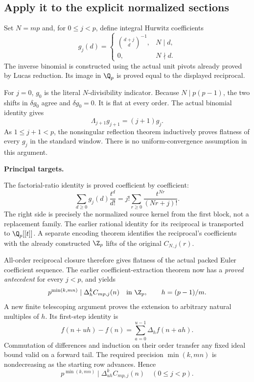 \subsection*{Apply it to the explicit normalized sections}
Set $N=mp$ and, for $0\le j<p$, define integral Hurwitz coefficients
\[
 g_j(d)=
 \begin{cases}
 \displaystyle\binom{d+j}{d}^{-1},&N\mid d,\\[1mm]
 0,&N\nmid d.
 \end{cases}
\]
The inverse binomial is constructed using the actual unit pivots already proved by Lucas reduction. Its image in $\Q_p$ is proved equal to the displayed reciprocal.

For $j=0$, $g_0$ is the literal $N$-divisibility indicator. Because $N\mid p(p-1)$, the two shifts in $\delta g_0$ agree and $\delta g_0=0$. It is flat at every order. The actual binomial identity gives
\[
 \Lambda_{j+1}g_{j+1}=(j+1)g_j.
\]
As $1\le j+1<p$, the nonsingular reflection theorem inductively proves flatness of every $g_j$ in the standard window. There is no uniform-convergence assumption in this argument.

\textbf{Principal targets.}\par
{}\par
{}\par
{}

\par\medskip
{}
The factorial-ratio identity is proved coefficient by coefficient:
\[
 \sum_{d\ge0}g_j(d)\frac{t^d}{d!}
 =j!\sum_{r\ge0}\frac{t^{Nr}}{(Nr+j)!}.
\]
The right side is precisely the normalized source kernel from the first block, not a replacement family. The earlier rational identity for its reciprocal is transported to $\Q_p[[t]]$. A separate encoding theorem identifies the reciprocal's coefficients with the already constructed $\Z_p$ lifts of the original $C_{N,j}(r)$.

All-order reciprocal closure therefore gives flatness of the actual packed Euler coefficient sequence. The earlier coefficient-extraction theorem now has a \emph{proved antecedent} for every $j<p$, and yields
\[
 p^{\min(k,mn)}\mid\Delta_h^k C_{mp,j}(n)\quad\text{in }\Z_p,
 \qquad h=(p-1)/m.
\]
A new finite telescoping argument proves the extension to arbitrary natural multiples of $h$. Its first-step identity is
\[
 f(n+uh)-f(n)=\sum_{a=0}^{u-1}\Delta_h f(n+ah).
\]
Commutation of differences and induction on their order transfer any fixed ideal bound valid on a forward tail. The required precision $\min(k,mn)$ is nondecreasing as the starting row advances. Hence
\[
 \boxed{p^{\min(k,mn)}\mid\Delta_{uh}^{k}C_{mp,j}(n)\quad(0\le j<p).}
\]

